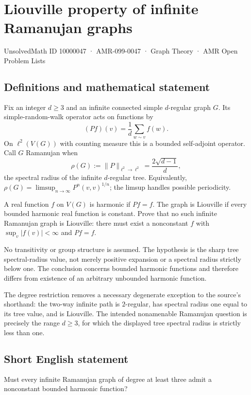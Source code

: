 \documentclass[11pt,a4paper]{article}
\begin{document}
\section*{Liouville property of infinite Ramanujan graphs}\label{10000047}
{\small UnsolvedMath ID 10000047 · AMR-099-0047 · Graph Theory · AMR Open Problem Lists}
\subsection{Definitions and mathematical statement}
Fix an integer $d\ge3$ and an infinite connected simple $d$-regular graph $G$. Its simple-random-walk operator acts on functions by
\[
(Pf)(v)=\frac1d\sum_{w\sim v}f(w).
\]
On $\ell^2(V(G))$ with counting measure this is a bounded self-adjoint operator. Call $G$ Ramanujan when
\[
\rho(G):=\|P\|_{\ell^2\to\ell^2}=\frac{2\sqrt{d-1}}{d},
\]
the spectral radius of the infinite $d$-regular tree. Equivalently, $\rho(G)=\limsup_{n\to\infty}P^n(v,v)^{1/n}$; the limsup handles possible periodicity.

A real function $f$ on $V(G)$ is harmonic if $Pf=f$. The graph is Liouville if every bounded harmonic real function is constant. Prove that no such infinite Ramanujan graph is Liouville: there must exist a nonconstant $f$ with $\sup_v|f(v)|<\infty$ and $Pf=f$.

No transitivity or group structure is assumed. The hypothesis is the sharp tree spectral-radius value, not merely positive expansion or a spectral radius strictly below one. The conclusion concerns bounded harmonic functions and therefore differs from existence of an arbitrary unbounded harmonic function.

The degree restriction removes a necessary degenerate exception to the source's shorthand: the two-way infinite path is $2$-regular, has spectral radius one equal to its tree value, and is Liouville. The intended nonamenable Ramanujan question is precisely the range $d\ge3$, for which the displayed tree spectral radius is strictly less than one.
\subsection{Short English statement}
Must every infinite Ramanujan graph of degree at least three admit a nonconstant bounded harmonic function?
\end{document}

